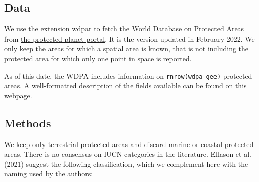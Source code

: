 \documentclass[
  letterpaper,
  DIV=11,
  numbers=noendperiod]{scrartcl}
\begin{document}
\hypertarget{data}{%
\subsection{Data}\label{data}}

We use the extension wdpar to fetch the World Database on Protected
Areas from \href{https://www.protectedplanet.net/en}{the protected
planet portal}. It is the version updated in February 2022. We only keep
the areas for which a spatial area is known, that is not including the
protected area for which only one point in space is reported.

As of this date, the WDPA includes information on
\texttt{rnrow(wdpa\_gee)} protected areas. A well-formatted description
of the fields available can be found
\href{https://developers.google.com/earth-engine/datasets/catalog/WCMC_WDPA_current_polygons}{on
this webpage}.

\hypertarget{methods}{%
\subsection{Methods}\label{methods}}

We keep only terrestrial protected areas and discard marine or coastal
protected areas. There is no consensus on IUCN categories in the
literature. Ellason et al. (2021) suggest the following classification,
which we complement here with the naming used by the authors:
\end{document}
